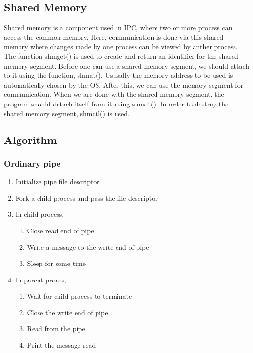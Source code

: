 \subsection{Shared Memory}
Shared memory is a component used in IPC, where two or more process can access
the common memory. Here, communication is done via this shared memory where
changes made by one process can be viewed by anther process. The function shmget()
is used to create and return an identifier for the shared memory segment. Before
one can use a shared memory segment, we should attach to it using the function,
shmat(). Ususally the memory address to be used is automatically chosen by the
OS. After this, we can use the memory segment for communication. When we are
done with the shared memory segment, the program should detach itself from it
using shmdt(). In order to destroy the shared memory segment, shmctl() is used.


\subsection{Algorithm}
\subsubsection{Ordinary pipe}
\begin{enumerate}
  \item Initialize pipe file descriptor
  \item Fork a child process and pass the file descriptor
  \item In child process,
  \begin{enumerate}
    \item Close read end of pipe
    \item Write a message to the write end of pipe
    \item Sleep for some time
  \end{enumerate}
  \item In parent proces,
  \begin{enumerate}
    \item Wait for child process to terminate
    \item Close the write end of pipe
    \item Read from the pipe
    \item Print the message read
  \end{enumerate}
\end{enumerate}

